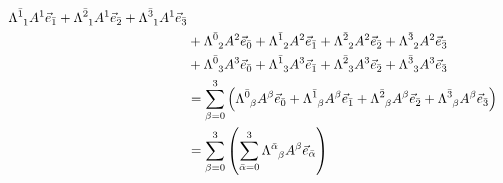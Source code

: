 \documentclass[gr-notes.tex]{subfiles}
\begin{document}
\begin{align*}
  \tensor{\Lambda}{^{\bar1}_1} \tensor{A}{^1} \vec{e}_{\bar1} +
  \tensor{\Lambda}{^{\bar2}_1} \tensor{A}{^1} \vec{e}_{\bar2} +
  \tensor{\Lambda}{^{\bar3}_1} \tensor{A}{^1} \vec{e}_{\bar3}
  \\ &+
  \tensor{\Lambda}{^{\bar0}_2} \tensor{A}{^2} \vec{e}_{\bar0} +
  \tensor{\Lambda}{^{\bar1}_2} \tensor{A}{^2} \vec{e}_{\bar1} +
  \tensor{\Lambda}{^{\bar2}_2} \tensor{A}{^2} \vec{e}_{\bar2} +
  \tensor{\Lambda}{^{\bar3}_2} \tensor{A}{^2} \vec{e}_{\bar3}
  \\ &+
  \tensor{\Lambda}{^{\bar0}_3} \tensor{A}{^3} \vec{e}_{\bar0} +
  \tensor{\Lambda}{^{\bar1}_3} \tensor{A}{^3} \vec{e}_{\bar1} +
  \tensor{\Lambda}{^{\bar2}_3} \tensor{A}{^3} \vec{e}_{\bar2} +
  \tensor{\Lambda}{^{\bar3}_3} \tensor{A}{^3} \vec{e}_{\bar3}
  \\ &=
  \sum_{\beta = 0}^3 \qty(
    \tensor{\Lambda}{^{\bar0}_\beta} \tensor{A}{^\beta} \vec{e}_{\bar0} +
    \tensor{\Lambda}{^{\bar1}_\beta} \tensor{A}{^\beta} \vec{e}_{\bar1} +
    \tensor{\Lambda}{^{\bar2}_\beta} \tensor{A}{^\beta} \vec{e}_{\bar2} +
    \tensor{\Lambda}{^{\bar3}_\beta} \tensor{A}{^\beta} \vec{e}_{\bar3}
  )
  \\ &=
  \sum_{\beta = 0}^3 \qty(
    \sum_{\bar\alpha = 0}^3
      \tensor{\Lambda}{^{\bar\alpha}_\beta}
      \tensor{A}{^\beta}
      \vec{e}_{\bar\alpha}
  )
\end{align*}
\end{document}
